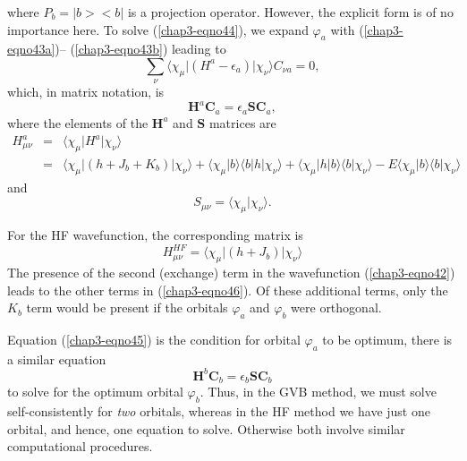 where $P_b = \vert b > < b \vert$ is a projection operator.
However, the explicit form is of no importance here.  To solve
(\ref{chap3-eqno44}), we expand $\varphi_a$ with (\ref{chap3-eqno43a})--
(\ref{chap3-eqno43b}) leading to
\begin{equation}
\sum_{\nu} \langle \chi_{\mu} \vert \left( H^a - \epsilon_a \right) 
\vert \chi_{\nu} \rangle C_{\nu a} = 0 ,
\end{equation}
which, in matrix notation, is
\begin{equation}
\mathbf{H}^a \mathbf{C}_a = \epsilon_a \mathbf{SC}_a 
,
\label{chap3-eqno45}
\end{equation}
where the elements of the $\mathbf{H}^a$ and $\mathbf{S}$ matrices are
\begin{eqnarray}
H^a_{\mu \nu} &=& \langle \chi_{\mu} \vert H^a \vert \chi_{\nu} 
\rangle\\
&=& \langle \chi_{\mu} \vert \left( h + J_b + K_b \right) 
\vert \chi_{\nu} \rangle + \langle \chi_{\mu} \vert b \rangle \langle 
b \vert h \vert \chi_{\nu} \rangle + \langle \chi_{\mu} \vert h \vert 
b \rangle \langle b \vert \chi_{\nu} \rangle - E \langle \chi_{\mu} 
\vert b \rangle \langle b \vert \chi_{\nu} \rangle
\label{chap3-eqno46}
\end{eqnarray}
and
\begin{equation}
S_{\mu \nu} = \langle \chi_{\mu} \vert \chi_{\nu} \rangle .
\end{equation}

For the HF wavefunction, the corresponding matrix is
\begin{equation}
H^{HF}_{\mu \nu} = \langle \chi_{\mu} \vert \left( h + J_b \right) 
\vert \chi_{\nu} \rangle
\end{equation}
The presence of the second (exchange) term in the wavefunction
(\ref{chap3-eqno42}) leads to the other terms in (\ref{chap3-eqno46}).  Of
these additional terms, only the $K_b$ term would be present if the
orbitals $\varphi_a$ and $\varphi_b$ were orthogonal.

Equation (\ref{chap3-eqno45}) is the condition for orbital $\varphi_a$
to be optimum, there is a similar equation
\begin{equation}
\mathbf{H}^b \mathbf{C}_b = \epsilon_b \mathbf{SC}_b
\end{equation}
to solve for the optimum orbital $\varphi_b$.  Thus, in the GVB
method, we must solve self-consistently for \emph{two} orbitals,
whereas in the HF method we have just one orbital, and hence, one
equation to solve.  Otherwise both involve similar computational
procedures.

